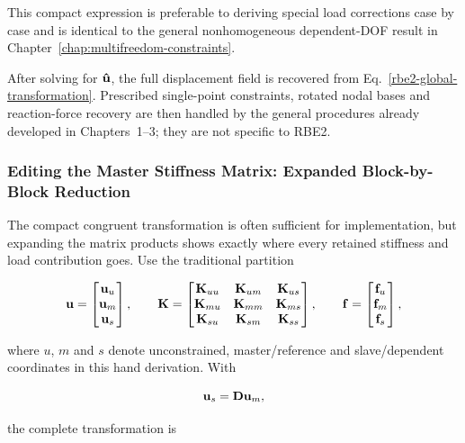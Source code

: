 This compact expression is preferable to deriving special load corrections case
by case and is identical to the general nonhomogeneous dependent-DOF result in
Chapter~\ref{chap:multifreedom-constraints}.

After solving for $\mathbf{\hat{u}}$, the full displacement field is recovered from
Eq.~\eqref{rbe2-global-transformation}. Prescribed single-point constraints,
rotated nodal bases and reaction-force recovery are then handled by the general
procedures already developed in Chapters~1--3; they are not specific to RBE2.


\subsubsection{Editing the Master Stiffness Matrix: Expanded Block-by-Block Reduction}

The compact congruent transformation is often sufficient for implementation,
but expanding the matrix products shows exactly where every retained stiffness
and load contribution goes. Use the traditional partition

\begin{equation}
    \mathbf{u}=\begin{bmatrix}\mathbf{u}_u\\\mathbf{u}_m\\\mathbf{u}_s\end{bmatrix},
    \qquad
    \mathbf{K}=\begin{bmatrix}
        \mathbf{K}_{uu}&\mathbf{K}_{um}&\mathbf{K}_{us}\\
        \mathbf{K}_{mu}&\mathbf{K}_{mm}&\mathbf{K}_{ms}\\
        \mathbf{K}_{su}&\mathbf{K}_{sm}&\mathbf{K}_{ss}
    \end{bmatrix},
    \qquad
    \mathbf{f}=\begin{bmatrix}\mathbf{f}_u\\\mathbf{f}_m\\\mathbf{f}_s\end{bmatrix},
\end{equation}

where $u$, $m$ and $s$ denote unconstrained, master/reference and
slave/dependent coordinates in this hand derivation. With

\begin{equation}
    \mathbf{u}_s=\mathbf{D}\mathbf{u}_m,
\end{equation}

the complete transformation is

